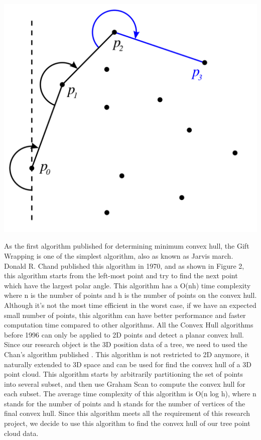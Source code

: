 \documentclass[runningheads,a4paper]{llncs}
\begin{document}
\begin{minipage}{\linewidth}
  \centering
  \includegraphics[scale=.1]{ConvexHull1.png}
  \label{fig:ConvexHull1}
\end{minipage}

As the first algorithm published for determining minimum convex hull, the Gift Wrapping \cite{7} is one of the simplest algorithm,  also as known as Jarvis march.  Donald R. Chand published this algorithm in 1970, and as shown in Figure 2, this algorithm starts from the left-most point and try to find the next point which have the largest polar angle. This algorithm has a O(nh) time complexity where n is the number of points and h is the number of points on the convex hull. Although it’s not the most time efficient in the worst case, if we have an expected small number of points, this algorithm can have better performance and faster computation time compared to other algorithms.
All the Convex Hull algorithms before 1996 can only be applied to 2D points and detect a planar convex hull. Since our research object is the 3D position data of a tree, we need to used the Chan’s algorithm published \cite{8}. This algorithm is not restricted to 2D anymore, it naturally extended to 3D space and can be used for find the convex hull of a 3D point cloud. This algorithm starts by arbitrarily partitioning the set of points into several subset, and then use Graham Scan to compute the convex hull for each subset. The average time complexity of this algorithm is  O(n log h), where n stands for the number of points and h stands for the number of vertices of the final convex hull. Since this algorithm meets all the requirement of this research project, we decide to use this algorithm to find the convex hull of our tree point cloud data.
\end{document}

